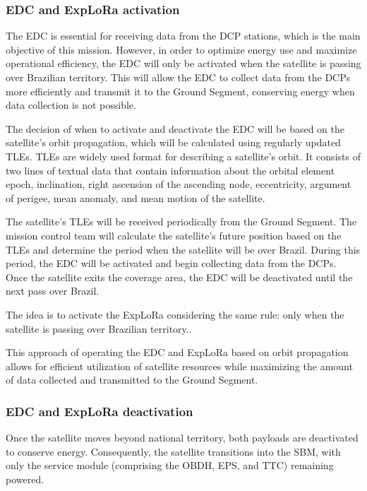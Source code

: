 \subsubsection{EDC and ExpLoRa activation}

The \ac{EDC} is essential for receiving data from the \ac{DCP} stations, which is the main objective of this mission. However, in order to optimize energy use and maximize operational efficiency, the \ac{EDC} will only be activated when the satellite is passing over Brazilian territory. This will allow the \ac{EDC} to collect data from the \acp{DCP} more efficiently and transmit it to the Ground Segment, conserving energy when data collection is not possible.

The decision of when to activate and deactivate the \ac{EDC} will be based on the satellite's orbit propagation, which will be calculated using regularly updated \acp{TLE}. \acp{TLE} are widely used format for describing a satellite's orbit. It consists of two lines of textual data that contain information about the orbital element epoch, inclination, right ascension of the ascending node, eccentricity, argument of perigee, mean anomaly, and mean motion of the satellite.

The satellite's \acp{TLE} will be received periodically from the Ground Segment. The mission control team will calculate the satellite's future position based on the \acp{TLE} and determine the period when the satellite will be over Brazil. During this period, the \ac{EDC} will be activated and begin collecting data from the \acp{DCP}. Once the satellite exits the coverage area, the \ac{EDC} will be deactivated until the next pass over Brazil.

The idea is to activate the ExpLoRa considering the same rule: only when the satellite is passing over Brazilian territory..

This approach of operating the \ac{EDC} and ExpLoRa based on orbit propagation allows for efficient utilization of satellite resources while maximizing the amount of data collected and transmitted to the Ground Segment.

\subsubsection{EDC and ExpLoRa deactivation}

Once the satellite moves beyond national territory, both payloads are deactivated to conserve energy. Consequently, the satellite transitions into the \ac{SBM}, with only the service module (comprising the \ac{OBDH}, \ac{EPS}, and \ac{TTC}) remaining powered.

